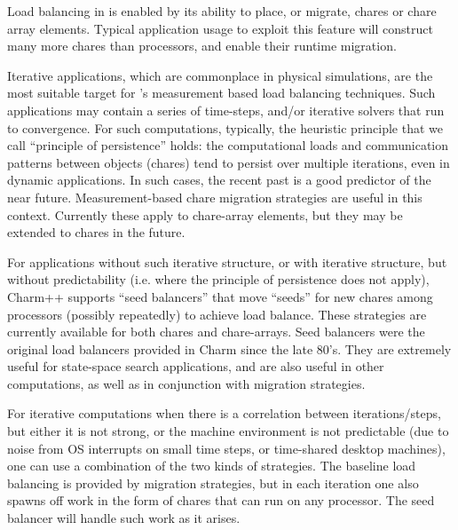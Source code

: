 
\label{loadbalancing}


Load balancing in \charmpp{} is enabled by its ability to place, or
migrate, chares or chare array elements.  Typical application usage to
exploit this feature will construct many more chares than processors, and
enable their runtime migration.

Iterative applications, which are commonplace in physical simulations,
are the most suitable target for \charmpp{}'s measurement based load
balancing techniques.  Such applications may contain a series of
time-steps, and/or iterative solvers that run to convergence. For such
computations, typically, the heuristic principle that we call
``principle of persistence'' holds: the computational loads and
communication patterns between objects (chares) tend to persist over
multiple iterations, even in dynamic applications. In such cases,
the recent past is a good predictor of the near future. Measurement-based
chare migration strategies are useful in this context. Currently these
apply to chare-array elements, but they may be extended to chares in
the future.

For applications without such iterative structure, or with iterative
structure, but without predictability (i.e. where the principle of
persistence does not apply), Charm++ supports ``seed balancers'' that
move ``seeds'' for new chares among processors (possibly repeatedly)
to achieve load balance. These strategies are currently available for
both chares and chare-arrays.  Seed balancers were the original load
balancers provided in Charm since the late 80's. They are extremely
useful for state-space search applications, and are also useful in
other computations, as well as in conjunction with migration
strategies.

For iterative computations when there is a correlation between iterations/steps,
but either it is not strong, or the machine environment is not predictable
(due to noise from OS interrupts on small time steps, or time-shared desktop
machines), one can use a combination of the two kinds of strategies. The
baseline load balancing is provided by migration strategies, but in each
iteration one also spawns off work in the form of chares that can run on any
processor. The seed balancer will handle such work as it arises.

